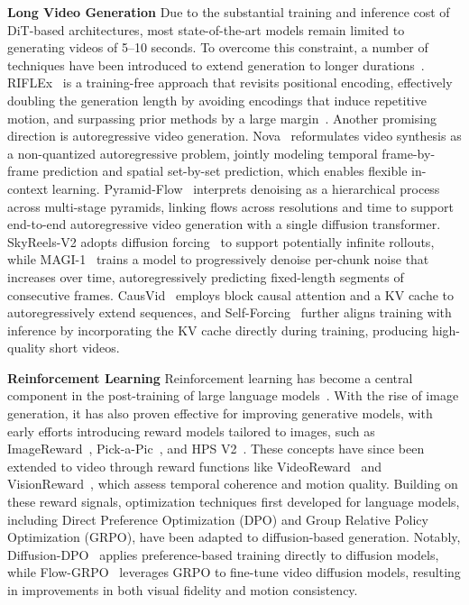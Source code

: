\textbf{Long Video Generation}
Due to the substantial training and inference cost of DiT-based architectures, most state-of-the-art models remain limited to generating videos of 5–10 seconds. To overcome this constraint, a number of techniques have been introduced to extend generation to longer durations~\citep{jiang2025lovic,kodaira2025streamdit,fang2025inflvg,lin2025autoregressive}. RIFLEx~\citep{zhao2025riflex} is a training-free approach that revisits positional encoding, effectively doubling the generation length by avoiding encodings that induce repetitive motion, and surpassing prior methods by a large margin~\citep{chen2023extending,peng2023yarn,zhuo2024lumina}. Another promising direction is autoregressive video generation. Nova~\citep{deng2024autoregressive} reformulates video synthesis as a non-quantized autoregressive problem, jointly modeling temporal frame-by-frame prediction and spatial set-by-set prediction, which enables flexible in-context learning. Pyramid-Flow~\citep{jin2024pyramidal} interprets denoising as a hierarchical process across multi-stage pyramids, linking flows across resolutions and time to support end-to-end autoregressive video generation with a single diffusion transformer. SkyReels-V2 adopts diffusion forcing~\citep{chen2024diffusion} to support potentially infinite rollouts, while MAGI-1~\citep{teng2025magi} trains a model to progressively denoise per-chunk noise that increases over time, autoregressively predicting fixed-length segments of consecutive frames. CausVid~\citep{yin2025causvid} employs block causal attention and a KV cache to autoregressively extend sequences, and Self-Forcing~\citep{huang2025self} further aligns training with inference by incorporating the KV cache directly during training, producing high-quality short videos.

\textbf{Reinforcement Learning}
Reinforcement learning has become a central component in the post-training of large language models~\citep{ouyang2022training,kumar2024training,hou2025advancing,xie2025teaching}. With the rise of image generation, it has also proven effective for improving generative models, with early efforts introducing reward models tailored to images, such as ImageReward~\citep{xu2023imagereward}, Pick-a-Pic~\citep{kirstain2023pick}, and HPS V2~\citep{wu2023human}. These concepts have since been extended to video through reward functions like VideoReward~\citep{liu2025improving} and VisionReward~\citep{xu2024visionrewardfinegrainedmultidimensionalhuman}, which assess temporal coherence and motion quality. Building on these reward signals, optimization techniques first developed for language models, including Direct Preference Optimization (DPO)\citep{rafailov2023direct} and Group Relative Policy Optimization (GRPO)\citep{shao2024deepseekmath}, have been adapted to diffusion-based generation. Notably, Diffusion-DPO~\citep{wallace2024diffusion} applies preference-based training directly to diffusion models, while Flow-GRPO~\citep{liu2025flow,xue2025dancegrpo} leverages GRPO to fine-tune video diffusion models, resulting in improvements in both visual fidelity and motion consistency.